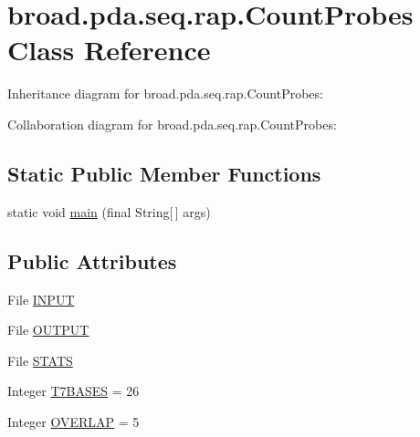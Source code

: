 \hypertarget{classbroad_1_1pda_1_1seq_1_1rap_1_1_count_probes}{\section{broad.\+pda.\+seq.\+rap.\+Count\+Probes Class Reference}
\label{classbroad_1_1pda_1_1seq_1_1rap_1_1_count_probes}
}


Inheritance diagram for broad.\+pda.\+seq.\+rap.\+Count\+Probes\+:


Collaboration diagram for broad.\+pda.\+seq.\+rap.\+Count\+Probes\+:
\subsection*{Static Public Member Functions}
\begin{DoxyCompactItemize}
\item 
static void \hyperlink{classbroad_1_1pda_1_1seq_1_1rap_1_1_count_probes_a699da2067831002738a42f75e8684466}{main} (final String\mbox{[}$\,$\mbox{]} args)
\end{DoxyCompactItemize}
\subsection*{Public Attributes}
\begin{DoxyCompactItemize}
\item 
File \hyperlink{classbroad_1_1pda_1_1seq_1_1rap_1_1_count_probes_a3d820f4558bfe52a29fd2827b98a4e70}{I\+N\+P\+U\+T}
\item 
File \hyperlink{classbroad_1_1pda_1_1seq_1_1rap_1_1_count_probes_a2140ef0698fbcfc5f3837e70dc753435}{O\+U\+T\+P\+U\+T}
\item 
File \hyperlink{classbroad_1_1pda_1_1seq_1_1rap_1_1_count_probes_a9dadc2b6bd9a4aeb03283d74dd7d57d7}{S\+T\+A\+T\+S}
\item 
Integer \hyperlink{classbroad_1_1pda_1_1seq_1_1rap_1_1_count_probes_ad751ce40f641b7bb4c72c3e7591fe263}{T7\+B\+A\+S\+E\+S} = 26
\item 
Integer \hyperlink{classbroad_1_1pda_1_1seq_1_1rap_1_1_count_probes_acace1854eee280cd305f28c55832a00b}{O\+V\+E\+R\+L\+A\+P} = 5
\end{DoxyCompactItemize}
